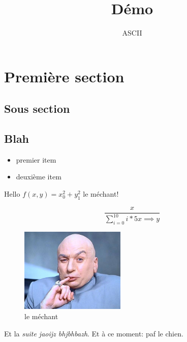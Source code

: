 \documentclass{article}
\title{Démo}
\author{ASCII}
\date{}
\begin{document}
\maketitle
\tableofcontents

\section{Première section}

\subsection{Sous section}

\subsection{Blah}
\label{sec:blah}

\begin{itemize}
\item premier item
\item deuxième item
\end{itemize}


Hello     $f(x, y) = x_0^2 + y_1^2$     le méchant!

\begin{equation}
\frac{x}{\sum_{i=0}^{10}i*5 x\implies y}
\end{equation}

\begin{figure}[h]
  \centering
  \includegraphics[width=5cm]{dr_evil}
  
\caption{le méchant}
\end{figure}
Et la \emph{suite jaoijz bhjbhbazh}. Et à ce moment: paf le chien.


\cite{art}

\listoffigures



\end{document}
